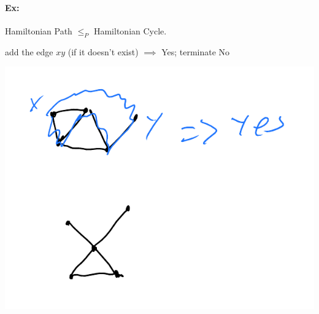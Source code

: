 \documentclass[12 pt]{article}
\begin{document}
          \paragraph{Ex:} Hamiltonian Path $\leq_P$ Hamiltonian Cycle.
          \begin{algorithmic}
                \State add the edge $xy$ (if it doesn't exist)
                 $\implies$
                Yes; terminate
                \EndIf
            \EndFor
            \State No
          \end{algorithmic}
          \includegraphics[width=.9\textwidth]{i123}
        
\end{document}
